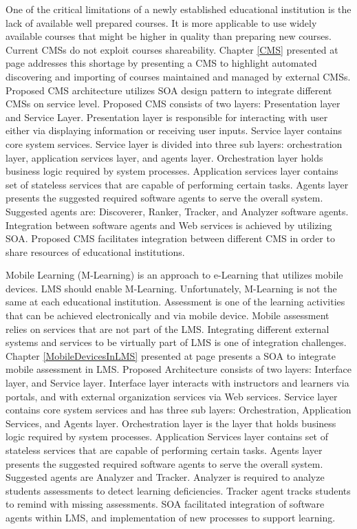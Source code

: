 \documentclass[12pt,a4paper,final,twoside,onecolumn,titlepage]{book}
\begin{document}
One of the critical limitations of a newly established educational institution is the lack of available well prepared courses. It is more applicable to use widely available courses that might be higher in quality than preparing new courses. Current \gls{CMS}s do not exploit courses shareability. Chapter \ref{CMS} presented at page \pageref{CMS} addresses this shortage by presenting a \gls{CMS} to highlight automated discovering and importing of courses maintained and managed by external \gls{CMS}s. Proposed \gls{CMS} architecture utilizes \gls{SOA} design pattern to integrate different \gls{CMS}s on service level. Proposed \gls{CMS} consists of two layers: Presentation layer and Service Layer. Presentation layer is responsible for interacting with user either via displaying information or receiving user inputs. Service layer contains core system services. Service layer is divided into three sub layers: orchestration layer, application services layer, and agents layer. Orchestration layer holds business logic required by system processes. Application services layer contains set of stateless services that are capable of performing certain tasks. Agents layer presents the suggested required software agents to serve the overall system. Suggested agents are: Discoverer, Ranker, Tracker, and Analyzer software agents. Integration between software agents and Web services is achieved by utilizing \gls{SOA}. Proposed \gls{CMS} facilitates integration between different \gls{CMS} in order to share resources of educational institutions.

Mobile Learning (M-Learning) is an approach to e-Learning that utilizes mobile devices. \gls{LMS} should enable M-Learning. Unfortunately, M-Learning is not the same at each educational institution. Assessment is one of the learning activities that can be achieved electronically and via mobile device. Mobile assessment relies on services that are not part of the \gls{LMS}. Integrating different external systems and services to be virtually part of \gls{LMS} is one of integration challenges. Chapter \ref{MobileDevicesInLMS} presented at page \pageref{MobileDevicesInLMS} presents a \gls{SOA} to integrate mobile assessment in \gls{LMS}. Proposed Architecture consists of two layers: Interface layer, and Service layer. Interface layer interacts with instructors and learners via portals, and with external organization services via Web services. Service layer contains core system services and has three sub layers: Orchestration, Application Services, and Agents layer. Orchestration layer is the layer that holds business logic required by system processes. Application Services layer contains set of stateless services that are capable of performing certain tasks. Agents layer presents the suggested required software agents to serve the overall system. Suggested agents are Analyzer and Tracker. Analyzer is required to analyze students assessments to detect learning deficiencies. Tracker agent tracks students to remind with missing assessments. \gls{SOA} facilitated integration of software agents within \gls{LMS}, and implementation of new processes to support learning.
\end{document}
